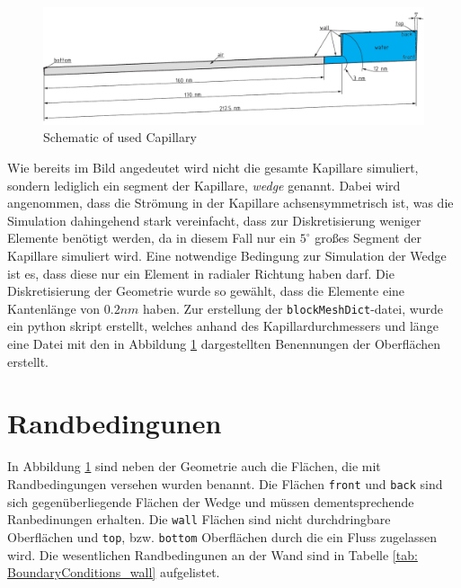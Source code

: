 \begin{figure}[h]
    \centering
    \includegraphics[width=.95\textwidth]{Pictures/Cap_5DEG.pdf}
    \caption{Schematic of used Capillary}
    \label{fig: Capillary Geometry}
\end{figure}
Wie bereits im Bild angedeutet wird nicht die gesamte Kapillare simuliert, sondern lediglich ein segment der Kapillare, \textit{wedge} genannt. Dabei wird angenommen, dass die Strömung in der Kapillare achsensymmetrisch ist, was die Simulation dahingehend stark vereinfacht, dass zur Diskretisierung weniger Elemente benötigt werden, da in diesem Fall nur ein $5^{\circ}$ großes Segment der Kapillare simuliert wird. Eine notwendige Bedingung zur Simulation der Wedge ist es, dass diese nur ein Element in radialer Richtung haben darf. 
Die Diskretisierung der Geometrie wurde so gewählt, dass die Elemente eine Kantenlänge von $0.2nm$ haben. Zur erstellung der \texttt{blockMeshDict}-datei, wurde ein python skript erstellt, welches anhand des Kapillardurchmessers und länge eine Datei mit den in Abbildung \ref{fig: Capillary Geometry} dargestellten Benennungen der Oberflächen erstellt. 

\section{Randbedingunen}
In Abbildung \ref{fig: Capillary Geometry} sind neben der Geometrie auch die Flächen, die mit Randbedingungen versehen wurden benannt. Die Flächen \texttt{front} und \texttt{back} sind sich gegenüberliegende Flächen der Wedge und müssen dementsprechende Ranbedinungen erhalten. Die \texttt{wall} Flächen sind nicht durchdringbare Oberflächen und \texttt{top}, bzw. \texttt{bottom} Oberflächen durch die ein Fluss zugelassen wird.
Die wesentlichen Randbedingunen an der Wand sind in Tabelle \ref{tab: BoundaryConditions_wall} aufgelistet. 

